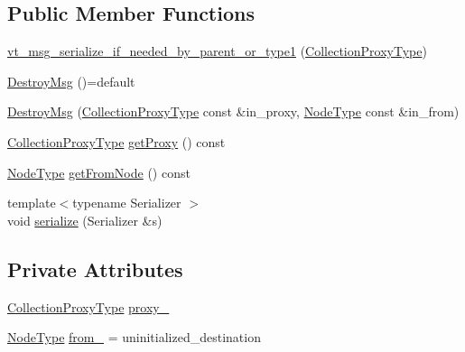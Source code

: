 \subsection*{Public Member Functions}
\begin{DoxyCompactItemize}
\item 
\hyperlink{structvt_1_1vrt_1_1collection_1_1_destroy_msg_ae9f2ea1d96f67bdb78a30fe8908eb690}{vt\+\_\+msg\+\_\+serialize\+\_\+if\+\_\+needed\+\_\+by\+\_\+parent\+\_\+or\+\_\+type1} (\hyperlink{structvt_1_1vrt_1_1collection_1_1_destroy_msg_a5bf089cacadf94e55e9ae797c4cd0462}{Collection\+Proxy\+Type})
\item 
\hyperlink{structvt_1_1vrt_1_1collection_1_1_destroy_msg_a3c7d44bb51d25e0853cb56c4403c2666}{Destroy\+Msg} ()=default
\item 
\hyperlink{structvt_1_1vrt_1_1collection_1_1_destroy_msg_a7a4d9c50086362cd44933fc4c2b6f53d}{Destroy\+Msg} (\hyperlink{structvt_1_1vrt_1_1collection_1_1_destroy_msg_a5bf089cacadf94e55e9ae797c4cd0462}{Collection\+Proxy\+Type} const \&in\+\_\+proxy, \hyperlink{namespacevt_a866da9d0efc19c0a1ce79e9e492f47e2}{Node\+Type} const \&in\+\_\+from)
\item 
\hyperlink{structvt_1_1vrt_1_1collection_1_1_destroy_msg_a5bf089cacadf94e55e9ae797c4cd0462}{Collection\+Proxy\+Type} \hyperlink{structvt_1_1vrt_1_1collection_1_1_destroy_msg_a57e8fd346b3298e9472cccbda65ed1d8}{get\+Proxy} () const
\item 
\hyperlink{namespacevt_a866da9d0efc19c0a1ce79e9e492f47e2}{Node\+Type} \hyperlink{structvt_1_1vrt_1_1collection_1_1_destroy_msg_a598fc97dc1277e545b741e1272da588c}{get\+From\+Node} () const
\item 
{\footnotesize template$<$typename Serializer $>$ }\\void \hyperlink{structvt_1_1vrt_1_1collection_1_1_destroy_msg_a112e71fb4a34cf0229b78ad36aa4d4ef}{serialize} (Serializer \&s)
\end{DoxyCompactItemize}
\subsection*{Private Attributes}
\begin{DoxyCompactItemize}
\item 
\hyperlink{structvt_1_1vrt_1_1collection_1_1_destroy_msg_a5bf089cacadf94e55e9ae797c4cd0462}{Collection\+Proxy\+Type} \hyperlink{structvt_1_1vrt_1_1collection_1_1_destroy_msg_ae8495f29e1e0627f6250543042a24c74}{proxy\+\_\+}
\item 
\hyperlink{namespacevt_a866da9d0efc19c0a1ce79e9e492f47e2}{Node\+Type} \hyperlink{structvt_1_1vrt_1_1collection_1_1_destroy_msg_af7e63ed16c9518f87d244fc8b0cb9ed4}{from\+\_\+} = uninitialized\+\_\+destination
\end{DoxyCompactItemize}
